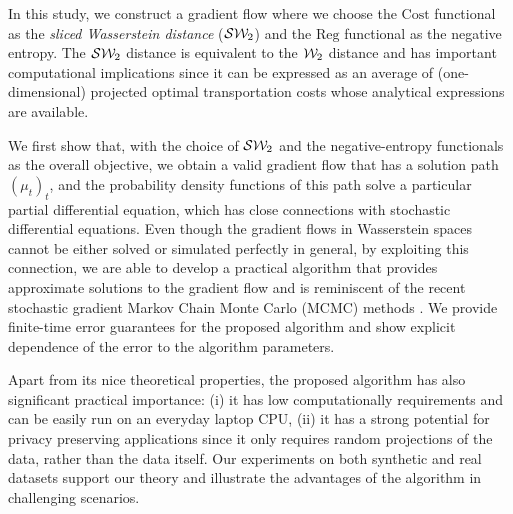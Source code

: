 In this study, we construct a gradient flow where we choose the $\mathrm{Cost}$ functional as the \textit{sliced Wasserstein distance} (${\cal S}{\cal W}_2$) and the $\mathrm{Reg}$ functional as the negative entropy. The ${\cal S}{\cal W}_2$ distance is equivalent to the ${\cal W}_2$ distance \cite{bonnotte2013unidimensional} and has important computational implications since it can be expressed as an average of (one-dimensional) projected optimal transportation costs whose analytical expressions are available. 

We first show that, with the choice of ${\cal S}{\cal W}_2$ and the negative-entropy functionals as the overall objective, we obtain a valid gradient flow that has a solution path $(\mu_t)_t$, and the probability density functions of this path solve a particular partial differential equation, which has close connections with stochastic differential equations. Even though the gradient flows in Wasserstein spaces cannot be either solved or simulated perfectly in general, by exploiting this connection, we are able to develop a practical algorithm that provides approximate solutions to the gradient flow and is reminiscent of the recent stochastic gradient Markov Chain Monte Carlo (MCMC) methods \cite{WelTeh2011a,raginsky17a}. We provide finite-time error guarantees for the proposed algorithm and show explicit dependence of the error to the algorithm parameters. 

Apart from its nice theoretical properties, the proposed algorithm has also significant practical importance: (i) it has low computationally requirements and can be easily run on an everyday laptop CPU, (ii) it has a strong potential for privacy preserving applications since it only requires random projections of the data, rather than the data itself. Our experiments on both synthetic and real datasets support our theory and illustrate the advantages of the algorithm in challenging scenarios. 





